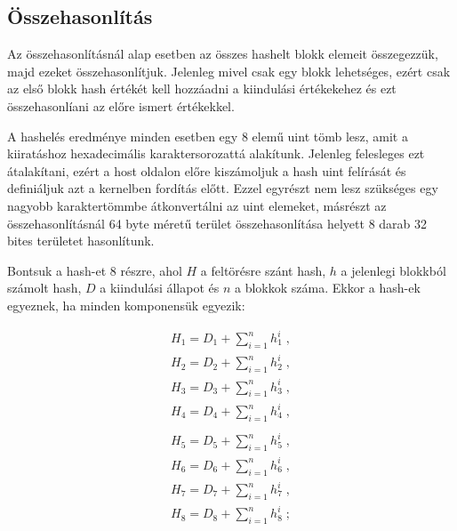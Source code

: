 \subsection{Összehasonlítás}

Az összehasonlításnál alap esetben az összes hashelt blokk elemeit összegezzük, majd ezeket összehasonlítjuk. Jelenleg mivel csak egy blokk lehetséges, ezért csak az első blokk hash értékét kell hozzáadni a kiindulási értékekehez és ezt összehasonlíani az előre ismert értékekkel.

A hashelés eredménye minden esetben egy 8 elemű uint tömb lesz, amit a kiiratáshoz hexadecimális karaktersorozattá alakítunk. Jelenleg felesleges ezt átalakítani, ezért a host oldalon előre kiszámoljuk a hash uint felírását és definiáljuk azt a kernelben fordítás előtt. Ezzel egyrészt nem lesz szükséges egy nagyobb karaktertömmbe átkonvertálni az uint elemeket, másrészt az összehasonlításnál 64 byte méretű terület összehasonlítása helyett 8 darab 32 bites területet hasonlítunk.

Bontsuk a hash-et 8 részre, ahol $H$ a feltörésre szánt hash, $h$ a jelenlegi blokkból számolt hash, $D$ a kiindulási állapot és $n$ a blokkok száma. Ekkor a hash-ek egyeznek, ha minden komponensük egyezik:
%
\begin{multicols}{2}

    \begin{equation*}
        \begin{split}
            H_1 = D_1 + \sum_{i=1}^{n} h_1^i \; , \\
            H_2 = D_2 + \sum_{i=1}^{n} h_2^i \; , \\
            H_3 = D_3 + \sum_{i=1}^{n} h_3^i \; , \\
            H_4 = D_4 + \sum_{i=1}^{n} h_4^i \; , \\
        \end{split}
    \end{equation*}
    \break
    \begin{equation*}
        \begin{split}
            H_5 = D_5 + \sum_{i=1}^{n} h_5^i \; , \\
            H_6 = D_6 + \sum_{i=1}^{n} h_6^i \; , \\
            H_7 = D_7 + \sum_{i=1}^{n} h_7^i \; , \\
            H_8 = D_8 + \sum_{i=1}^{n} h_8^i \; ; \\
        \end{split}
    \end{equation*}
    
\end{multicols}

